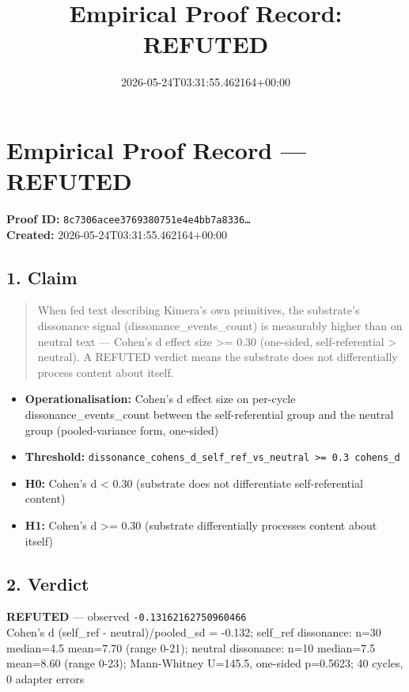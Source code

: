 \documentclass{article}
\title{Empirical Proof Record: REFUTED}
\date{2026-05-24T03:31:55.462164+00:00}
\begin{document}
\maketitle
\section*{Empirical Proof Record --- \textcolor{refuted}{\textbf{REFUTED}}}
\textbf{Proof ID:} \texttt{8c7306acee3769380751e4e4bb7a8336\dots}\\
\textbf{Created:} 2026-05-24T03:31:55.462164+00:00
\subsection*{1. Claim}
\begin{quote}When fed text describing Kimera's own primitives, the substrate's dissonance signal (dissonance\_events\_count) is measurably higher than on neutral text — Cohen's d effect size >= 0.30 (one-sided, self-referential > neutral). A REFUTED verdict means the substrate does not differentially process content about itself.\end{quote}
\begin{itemize}
\item \textbf{Operationalisation:} Cohen's d effect size on per-cycle dissonance\_events\_count between the self-referential group and the neutral group (pooled-variance form, one-sided)
\item \textbf{Threshold:} \texttt{dissonance\_cohens\_d\_self\_ref\_vs\_neutral >= 0.3 cohens\_d}
\item \textbf{H0:} Cohen's d < 0.30 (substrate does not differentiate self-referential content)
\item \textbf{H1:} Cohen's d >= 0.30 (substrate differentially processes content about itself)
\end{itemize}
\subsection*{2. Verdict}
\textcolor{refuted}{\textbf{REFUTED}} --- observed \texttt{-0.13162162750960466}\\
Cohen's d (self\_ref - neutral)/pooled\_sd = -0.132; self\_ref dissonance: n=30 median=4.5 mean=7.70 (range 0-21); neutral dissonance: n=10 median=7.5 mean=8.60 (range 0-23); Mann-Whitney U=145.5, one-sided p=0.5623; 40 cycles, 0 adapter errors
\end{document}
